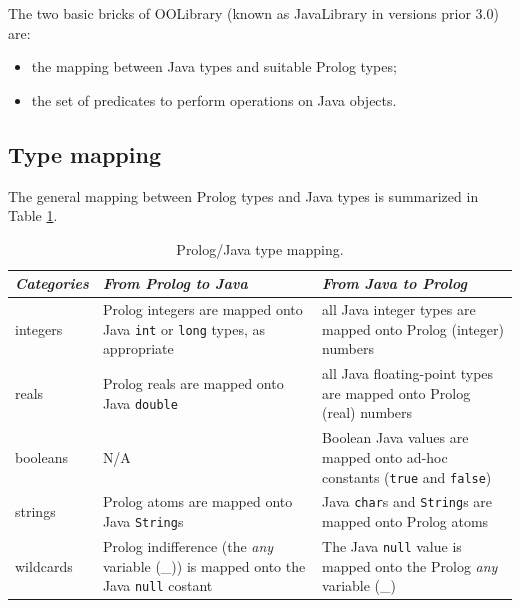 The two basic bricks of OOLibrary (known as JavaLibrary in \tuprolog{} versions prior 3.0) are:
\begin{itemize}
  \item the mapping between Java types and suitable Prolog types;
  \item the set of predicates to perform operations on Java objects.
\end{itemize}

\subsection{Type mapping}

The general mapping between Prolog types and Java types is summarized in Table \ref{tab:prolog-java-type-mapping}.

\begin{table}[h]
  \centering
  \begin{tabular}{|p{1.8cm}|p{4.7cm}|p{4.7cm}|}
  \hline
  \textit{Categories} & \textit{From Prolog to Java} & \textit{From Java to Prolog}\\
  \hline
  integers   & Prolog integers are mapped onto Java \texttt{int} or \texttt{long} types, as appropriate & all Java integer types are mapped onto Prolog (integer) numbers\\
  \hline
  reals      & Prolog reals are mapped onto Java \texttt{double} & all Java floating-point types are mapped onto Prolog (real) numbers\\
  \hline
  booleans   & N/A & Boolean Java values are mapped onto ad-hoc constants (\texttt{true} and \texttt{false})\\
  \hline
  strings    & Prolog atoms are mapped onto Java \texttt{String}s & Java \texttt{char}s and \texttt{String}s are mapped onto Prolog atoms\\
  \hline
  wildcards  & Prolog indifference (the \textit{any} variable (\_)) is mapped onto the Java \texttt{null} costant & The Java \texttt{null} value is mapped onto the Prolog \textit{any} variable (\_)\\
  \hline
  \end{tabular}
  \caption{Prolog/Java type mapping.}\label{tab:prolog-java-type-mapping}
\end{table}

